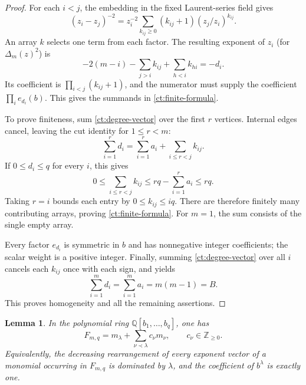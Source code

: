 \documentclass[reqno, 12pt]{article}
\numberwithin{equation}{section}
\newtheorem{lemma}[theorem]{Lemma}
\theoremstyle{definition}
\newcommand{\NN}{\mathbb Z_{\geq0}}
\begin{document}
\begin{proof}
For each $i<j$, the embedding in the fixed Laurent-series field
gives
\[
 (z_i-z_j)^{-2}
 =z_i^{-2}\sum_{k_{ij}\geq0}(k_{ij}+1)(z_j/z_i)^{k_{ij}}.
\]
An array $k$ selects one term from each factor.  The resulting exponent of $z_i$ (for $\Delta_m(z)^2$) is
\[
 -2(m-i)-\sum_{j>i}k_{ij}+\sum_{h<i}k_{hi}=-d_i.
\]
Its coefficient is $\prod_{i<j}(k_{ij}+1)$, and the numerator
must supply the coefficient $\prod_i e_{d_i}(b)$.  This gives the
summands in \eqref{ct:finite-formula}.

To prove finiteness, sum \eqref{ct:degree-vector} over the first
$r$ vertices.  Internal edges cancel, leaving the cut identity
for $1\leq r<m$:
\begin{equation}\label{ct:prefix}
 \sum_{i=1}^r d_i
 =\sum_{i=1}^r a_i+\sum_{i\leq r<j}k_{ij}.
\end{equation}
If $0\leq d_i\leq q$ for every $i$, this gives
\[
 0\leq\sum_{i\leq r<j}k_{ij}
 \leq rq-\sum_{i=1}^r a_i\leq rq.
\]
Taking $r=i$ bounds each entry by $0\leq k_{ij}\leq iq$.
There are therefore finitely many contributing arrays, proving
\eqref{ct:finite-formula}.  For $m=1$, the sum consists of the
single empty array.

Every factor $e_{d_i}$ is symmetric in $b$ and has nonnegative
integer coefficients; the scalar weight is a positive integer.
Finally, summing \eqref{ct:degree-vector} over all $i$ cancels
each $k_{ij}$ once with each sign, and yields
\begin{equation}\label{ct:total-degree}
 \sum_{i=1}^m d_i=\sum_{i=1}^m a_i=m(m-1)=B.
\end{equation}
This proves homogeneity and all the remaining assertions.
\end{proof}

\begin{lemma}\label{ct:dominance}
In the polynomial ring $\mathbb Q[b_1,\ldots,b_q]$, one has
\begin{equation}\label{ct:monic-triangular}
 F_{m,q}=m_\lambda+\sum_{\nu\prec\lambda}c_\nu m_\nu,
\qquad c_\nu\in\NN.
\end{equation}
Equivalently, the decreasing rearrangement of every exponent
vector of a monomial occurring in $F_{m,q}$ is dominated by
$\lambda$, and the coefficient of $b^\lambda$ is exactly one.
\end{lemma}
\end{document}
